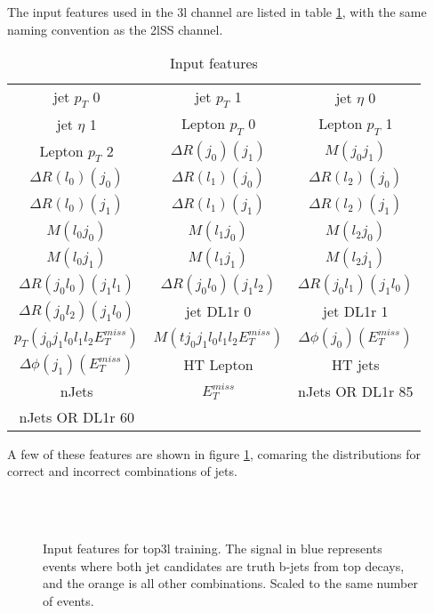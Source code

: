 The input features used in the 3l channel are listed in table \ref{tab:top3lfeatures}, with the same naming convention as the 2lSS channel.

\begin{table}[h!]
  \begin{center}
  \begin{tabular}{ccc}
    jet  $p_T$ 0 & jet  $p_T$ 1 & jet  $\eta$ 0 \\
    jet  $\eta$ 1 & Lepton  $p_T$ 0 & Lepton  $p_T$ 1 \\
    Lepton  $p_T$ 2 & $\Delta R(j_0)(j_1)$ & $M(j_0j_1)$ \\
    $\Delta R(l_0)(j_0)$ & $\Delta R(l_1)(j_0)$ & $\Delta R(l_2)(j_0)$ \\
    $\Delta R(l_0)(j_1)$ & $\Delta R(l_1)(j_1)$ & $\Delta R(l_2)(j_1)$ \\
    $M(l_0j_0)$ & $M(l_1j_0)$ & $M(l_2j_0)$ \\
    $M(l_0j_1)$ & $M(l_1j_1)$ & $M(l_2j_1)$ \\
    $\Delta R(j_0l_0)(j_1l_1)$ & $\Delta R(j_0l_0)(j_1l_2)$ & $\Delta R(j_0l_1)(j_1l_0)$ \\
    $\Delta R(j_0l_2)(j_1l_0)$ & jet DL1r 0 & jet DL1r 1 \\
     $p_T(j_0j_1l_0l_1l_2E_T^{miss})$ & $M(tj_0j_1l_0l_1l_2E_T^{miss})$ & $\Delta\phi(j_0)(E_T^{miss})$ \\
    $\Delta\phi(j_1)(E_T^{miss})$ & HT Lepton & HT jets \\
    nJets & $E_T^{miss}$ & nJets OR DL1r 85 \\
    nJets OR DL1r 60 & & \\
  \end{tabular}
  \end{center}
  \caption{Input features}
  \label{tab:top3lfeatures}
\end{table}

A few of these features are shown in figure \ref{fig:features_top3l}, comaring the distributions for correct and incorrect combinations of jets.

\begin{figure}[h!]
    \\
    \\
    \caption{Input features for top3l training. The signal in blue represents events where both jet candidates are truth b-jets from top decays, and the orange is all other combinations. Scaled to the same number of events.}
    \label{fig:features_top3l}
\end{figure}

